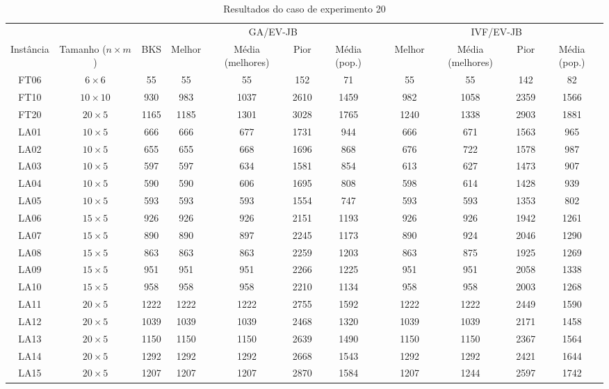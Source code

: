 \begin{sidewaystable}
\caption{Resultados do caso de experimento 20}
\centering
\label{experimento20}
\begin{tabular}{cccccccccccc}
\toprule
& & & \multicolumn{4}{c}{GA/EV-JB} & & \multicolumn{4}{c}{IVF/EV-JB} \\
\cmidrule(c){4-7}
\cmidrule(c){9-12}
Inst\^{a}ncia & Tamanho ($n \times m$) & BKS & Melhor & M\'{e}dia (melhores) & Pior & M\'{e}dia (pop.) & & Melhor & M\'{e}dia (melhores) & Pior & M\'{e}dia (pop.) \\
\midrule
FT06 & $6 \times 6$ & 55 & 55 & 55 & 152 & 71 & & 55 & 55 & 142 & 82 \\
FT10 & $10 \times 10$ & 930 & 983 & 1037 & 2610 & 1459 & & 982 & 1058 & 2359 & 1566 \\
FT20 & $20 \times 5$ & 1165 & 1185 & 1301 & 3028 & 1765 & & 1240 & 1338 & 2903 & 1881 \\
LA01 & $10 \times 5$ & 666 & 666 & 677 & 1731 & 944 & & 666 & 671 & 1563 & 965 \\
LA02 & $10 \times 5$ & 655 & 655 & 668 & 1696 & 868 & & 676 & 722 & 1578 & 987 \\
LA03 & $10 \times 5$ & 597 & 597 & 634 & 1581 & 854 & & 613 & 627 & 1473 & 907 \\
LA04 & $10 \times 5$ & 590 & 590 & 606 & 1695 & 808 & & 598 & 614 & 1428 & 939 \\
LA05 & $10 \times 5$ & 593 & 593 & 593 & 1554 & 747 & & 593 & 593 & 1353 & 802 \\
LA06 & $15 \times 5$ & 926 & 926 & 926 & 2151 & 1193 & & 926 & 926 & 1942 & 1261 \\
LA07 & $15 \times 5$ & 890 & 890 & 897 & 2245 & 1173 & & 890 & 924 & 2046 & 1290 \\
LA08 & $15 \times 5$ & 863 & 863 & 863 & 2259 & 1203 & & 863 & 875 & 1925 & 1269 \\
LA09 & $15 \times 5$ & 951 & 951 & 951 & 2266 & 1225 & & 951 & 951 & 2058 & 1338 \\
LA10 & $15 \times 5$ & 958 & 958 & 958 & 2210 & 1134 & & 958 & 958 & 2003 & 1268 \\
LA11 & $20 \times 5$ & 1222 & 1222 & 1222 & 2755 & 1592 & & 1222 & 1222 & 2449 & 1590 \\
LA12 & $20 \times 5$ & 1039 & 1039 & 1039 & 2468 & 1320 & & 1039 & 1039 & 2171 & 1458 \\
LA13 & $20 \times 5$ & 1150 & 1150 & 1150 & 2639 & 1490 & & 1150 & 1150 & 2367 & 1564 \\
LA14 & $20 \times 5$ & 1292 & 1292 & 1292 & 2668 & 1543 & & 1292 & 1292 & 2421 & 1644 \\
LA15 & $20 \times 5$ & 1207 & 1207 & 1207 & 2870 & 1584 & & 1207 & 1244 & 2597 & 1742 \\
\bottomrule
\end{tabular}
\end{sidewaystable}
